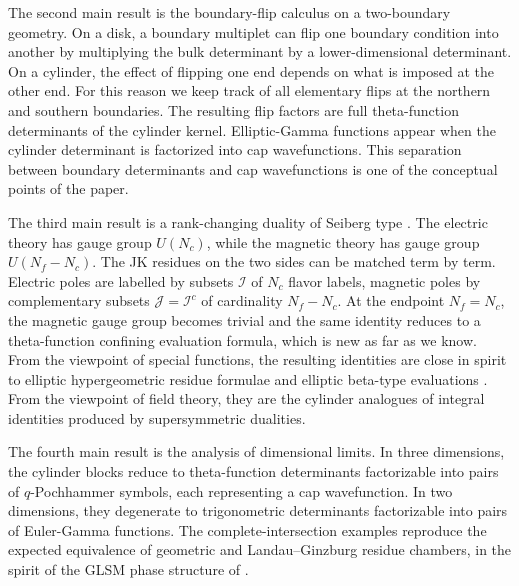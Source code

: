 \documentclass[11pt,a4paper]{article}
\numberwithin{equation}{section}
\theoremstyle{plain}
\theoremstyle{definition}
\theoremstyle{remark}
\begin{document}
The second main result is the boundary-flip calculus on a two-boundary geometry.  On a disk, a boundary multiplet can flip one boundary condition into another by multiplying the bulk determinant by a lower-dimensional determinant.  On a cylinder, the effect of flipping one end depends on what is imposed at the other end.  For this reason we keep track of all elementary flips at the northern and southern boundaries. The resulting flip factors are full theta-function determinants of the cylinder kernel. Elliptic-Gamma functions appear when the cylinder determinant is factorized into cap wavefunctions.  This separation between boundary determinants and cap wavefunctions is one of the conceptual points of the paper.

The third main result is a rank-changing duality of Seiberg type \cite{Seiberg:1994pq}. The electric theory has gauge group \(U(N_c)\), while the magnetic theory has gauge group \(U(N_f-N_c)\). The JK residues on the two sides can be matched term by term. Electric poles are labelled by subsets \(\mathcal I\) of \(N_c\) flavor labels, magnetic poles by complementary subsets \(\mathcal J=\mathcal I^c\) of cardinality \(N_f-N_c\). At the endpoint \(N_f=N_c\), the magnetic gauge group becomes trivial and the same identity reduces to a theta-function confining evaluation formula, which is new as far as we know. From the viewpoint of special functions, the resulting identities are close in spirit to elliptic hypergeometric residue formulae and elliptic beta-type evaluations \cite{Spiridonov:2001ig,Rains:2003}.  From the viewpoint of field theory, they are the cylinder analogues of integral  identities produced by supersymmetric dualities.

The fourth main result is the analysis of dimensional limits. In three dimensions, the cylinder blocks reduce to theta-function determinants factorizable into pairs of $q$-Pochhammer symbols, each representing a cap wavefunction. In two dimensions, they degenerate to trigonometric determinants factorizable into pairs of Euler-Gamma functions. The complete-intersection examples reproduce the expected equivalence of geometric and Landau--Ginzburg residue chambers, in the spirit of the GLSM phase structure of \cite{Witten:1993yc}.  
\end{document}
